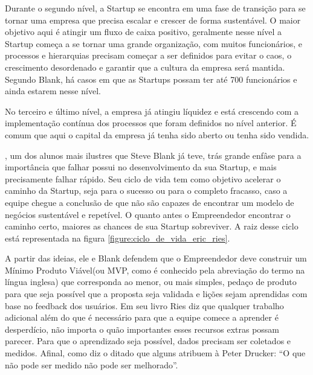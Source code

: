 Durante o segundo nível, a Startup se encontra em uma fase de transição para se tornar uma empresa que precisa escalar e crescer de forma sustentável. O maior objetivo aqui é atingir um fluxo de caixa positivo, geralmente nesse nível a Startup começa a se tornar uma grande organização, com muitos funcionários, e processos e hierarquias precisam começar a ser definidos para evitar o caos, o crescimento desordenado e garantir que a cultura da empresa será mantida. Segundo Blank, há casos em que as Startups possam ter até 700 funcionários e ainda estarem nesse nível.

No terceiro e último nível, a empresa já atingiu líquidez e está crescendo com a implementação contínua dos processos que foram definidos no nível anterior. É comum que aqui o capital da empresa já tenha sido aberto ou tenha sido vendida. 

, um dos alunos mais ilustres que Steve Blank já teve, trás grande enfâse para a importância que falhar possui no desenvolvimento da sua Startup, e mais precisamente falhar rápido. Seu ciclo de vida tem como objetivo acelerar o caminho da Startup, seja para o sucesso ou para o completo fracasso, caso a equipe chegue a conclusão de que não são capazes de encontrar um modelo de negócios sustentável e repetível. O quanto antes o Empreendedor encontrar o caminho certo, maiores as chances de sua Startup sobreviver. A raiz desse ciclo está representada na figura \ref{figure:ciclo_de_vida_eric_ries}.

A partir das ideias, ele e Blank defendem que o Empreendedor deve construir um Mínimo Produto Viável(ou MVP, como é conhecido pela abreviação do termo na língua inglesa) que corresponda ao menor, ou mais simples, pedaço de produto para que seja possível que a proposta seja validada e lições sejam aprendidas com base no feedback dos usuários. Em seu livro Ries diz que qualquer trabalho adicional além do que é necessário para que a equipe comece a aprender é desperdício, não importa o quão importantes esses recursos extras possam parecer. Para que o aprendizado seja possível, dados precisam ser coletados e medidos. Afinal, como diz o ditado que alguns atribuem à Peter Drucker: ``O que não pode ser medido não pode ser melhorado''. 

